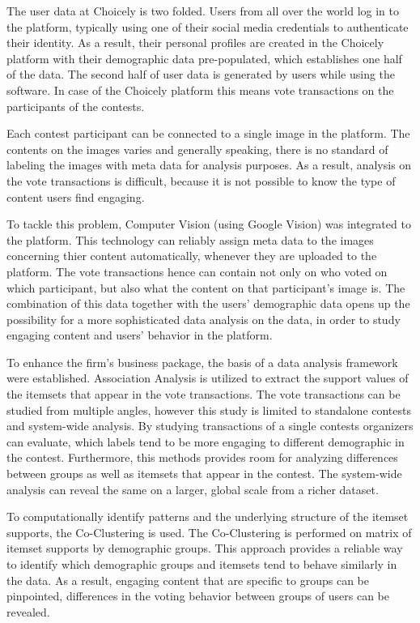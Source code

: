 The user data at Choicely is two folded. Users from all over the world log in to the platform, typically using one of their social media credentials to authenticate their identity. As a result, their personal profiles are created in the Choicely platform with their demographic data pre-populated, which establishes one half of the data. The second half of user data is generated by users while using the software. In case of the Choicely platform this means vote transactions on the participants of the contests. 

Each contest participant can be connected to a single image in the platform. The contents on the images varies and generally speaking, there is no standard of labeling the images with meta data for analysis purposes. As a result, analysis on the vote transactions is difficult, because it is not possible to know the type of content users find engaging.

To tackle this problem, Computer Vision (using Google Vision) was integrated to the platform. This technology can reliably assign meta data to the images concerning thier content automatically, whenever they are uploaded to the platform. The vote transactions hence can contain not only on who voted on which participant, but also what the content on that participant's image is. The combination of this data together with the users' demographic data opens up the possibility for a more sophisticated data analysis on the data, in order to study engaging content and users' behavior in the platform. 

To enhance the firm's business package, the basis of a data analysis framework were established. Association Analysis is utilized to extract the support values of the itemsets that appear in the vote transactions. The vote transactions can be studied from multiple angles, however this study is limited to standalone contests and system-wide analysis. By studying transactions of a single contests organizers can evaluate, which labels tend to be more engaging to different demographic in the contest. Furthermore, this methods provides room for analyzing differences between groups as well as itemsets that appear in the contest. The system-wide analysis can reveal the same on a larger, global scale from a richer dataset. 

To computationally identify patterns and the underlying structure of the itemset supports, the Co-Clustering is used. The Co-Clustering is performed on matrix of itemset supports by demographic groups. This approach provides a reliable way to identify which demographic groups and itemsets tend to behave similarly in the data. As a result, engaging content that are specific to groups can be pinpointed, differences in the voting behavior between groups of users can be revealed. 

